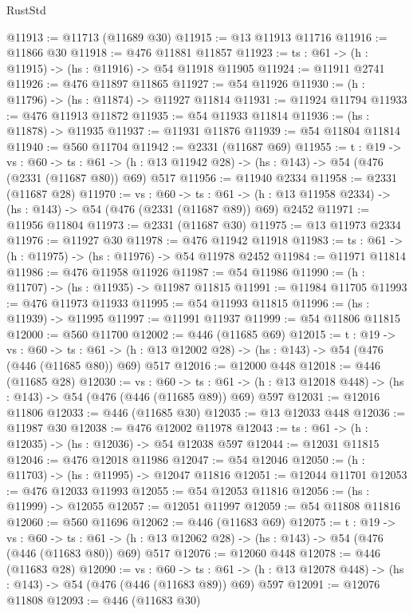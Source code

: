 \begin{lexlean}{RustStd}
\begin{coremodule}
@11913 := @11713 (@11689 @30)
@11915 := @13 @11913 @11716
@11916 := @11866 @30
@11918 := @476 @11881 @11857
@11923 := {ts : @61} -> (h : @11915) -> (hs : @11916) -> @54 @11918 @11905
@11924 := @11911 @2741
@11926 := @476 @11897 @11865
@11927 := @54 @11926
@11930 := (h : @11796) -> (hs : @11874) -> @11927 @11814
@11931 := @11924 @11794
@11933 := @476 @11913 @11872
@11935 := @54 @11933 @11814
@11936 := (hs : @11878) -> @11935
@11937 := @11931 @11876
@11939 := @54 @11804 @11814
@11940 := @560 @11704
@11942 := @2331 (@11687 @69)
@11955 := {t : @19} ->
  {vs : @60} ->
  {ts : @61} -> (h : @13 @11942 @28) -> (hs : @143) -> @54 (@476 (@2331 (@11687 @80)) @69) @517
@11956 := @11940 @2334
@11958 := @2331 (@11687 @28)
@11970 := {vs : @60} ->
  {ts : @61} -> (h : @13 @11958 @2334) -> (hs : @143) -> @54 (@476 (@2331 (@11687 @89)) @69) @2452
@11971 := @11956 @11804
@11973 := @2331 (@11687 @30)
@11975 := @13 @11973 @2334
@11976 := @11927 @30
@11978 := @476 @11942 @11918
@11983 := {ts : @61} -> (h : @11975) -> (hs : @11976) -> @54 @11978 @2452
@11984 := @11971 @11814
@11986 := @476 @11958 @11926
@11987 := @54 @11986
@11990 := (h : @11707) -> (hs : @11935) -> @11987 @11815
@11991 := @11984 @11705
@11993 := @476 @11973 @11933
@11995 := @54 @11993 @11815
@11996 := (hs : @11939) -> @11995
@11997 := @11991 @11937
@11999 := @54 @11806 @11815
@12000 := @560 @11700
@12002 := @446 (@11685 @69)
@12015 := {t : @19} ->
  {vs : @60} ->
  {ts : @61} -> (h : @13 @12002 @28) -> (hs : @143) -> @54 (@476 (@446 (@11685 @80)) @69) @517
@12016 := @12000 @448
@12018 := @446 (@11685 @28)
@12030 := {vs : @60} ->
  {ts : @61} -> (h : @13 @12018 @448) -> (hs : @143) -> @54 (@476 (@446 (@11685 @89)) @69) @597
@12031 := @12016 @11806
@12033 := @446 (@11685 @30)
@12035 := @13 @12033 @448
@12036 := @11987 @30
@12038 := @476 @12002 @11978
@12043 := {ts : @61} -> (h : @12035) -> (hs : @12036) -> @54 @12038 @597
@12044 := @12031 @11815
@12046 := @476 @12018 @11986
@12047 := @54 @12046
@12050 := (h : @11703) -> (hs : @11995) -> @12047 @11816
@12051 := @12044 @11701
@12053 := @476 @12033 @11993
@12055 := @54 @12053 @11816
@12056 := (hs : @11999) -> @12055
@12057 := @12051 @11997
@12059 := @54 @11808 @11816
@12060 := @560 @11696
@12062 := @446 (@11683 @69)
@12075 := {t : @19} ->
  {vs : @60} ->
  {ts : @61} -> (h : @13 @12062 @28) -> (hs : @143) -> @54 (@476 (@446 (@11683 @80)) @69) @517
@12076 := @12060 @448
@12078 := @446 (@11683 @28)
@12090 := {vs : @60} ->
  {ts : @61} -> (h : @13 @12078 @448) -> (hs : @143) -> @54 (@476 (@446 (@11683 @89)) @69) @597
@12091 := @12076 @11808
@12093 := @446 (@11683 @30)

\end{coremodule}
\end{lexlean}
